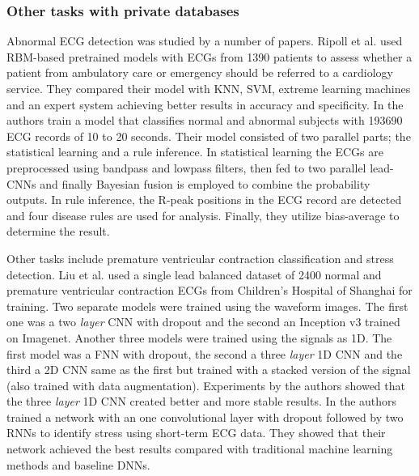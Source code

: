 \documentclass[journal]{IEEEtran}
\begin{document}
\subsubsection{Other tasks with private databases}
Abnormal ECG detection was studied by a number of papers.
Ripoll et al.\cite{ripoll2016ecg} used RBM-based pretrained models with ECGs from 1390 patients to assess whether a patient from ambulatory care or emergency should be referred to a cardiology service.
They compared their model with KNN, SVM, extreme learning machines and an expert system achieving better results in accuracy and specificity.
In\cite{jin2017classification} the authors train a model that classifies normal and abnormal subjects with 193690 ECG records of 10 to 20 seconds.
Their model consisted of two parallel parts; the statistical learning and a rule inference.
In statistical learning the ECGs are preprocessed using bandpass and lowpass filters, then fed to two parallel lead-CNNs and finally Bayesian fusion is employed to combine the probability outputs.
In rule inference, the R-peak positions in the ECG record are detected and four disease rules are used for analysis.
Finally, they utilize bias-average to determine the result.

Other tasks include premature ventricular contraction classification and stress detection.
Liu et al.\cite{liu2018detecting} used a single lead balanced dataset of 2400 normal and premature ventricular contraction ECGs from Children's Hospital of Shanghai for training.
Two separate models were trained using the waveform images.
The first one was a two \textit{layer} CNN with dropout and the second an Inception v3 trained on Imagenet.
Another three models were trained using the signals as 1D.
The first model was a FNN with dropout, the second a three \textit{layer} 1D CNN and the third a 2D CNN same as the first but trained with a stacked version of the signal (also trained with data augmentation).
Experiments by the authors showed that the three \textit{layer} 1D CNN created better and more stable results.
In\cite{hwang2018deep} the authors trained a network with an one convolutional layer with dropout followed by two RNNs to identify stress using short-term ECG data.
They showed that their network achieved the best results compared with traditional machine learning methods and baseline DNNs.
\end{document}
